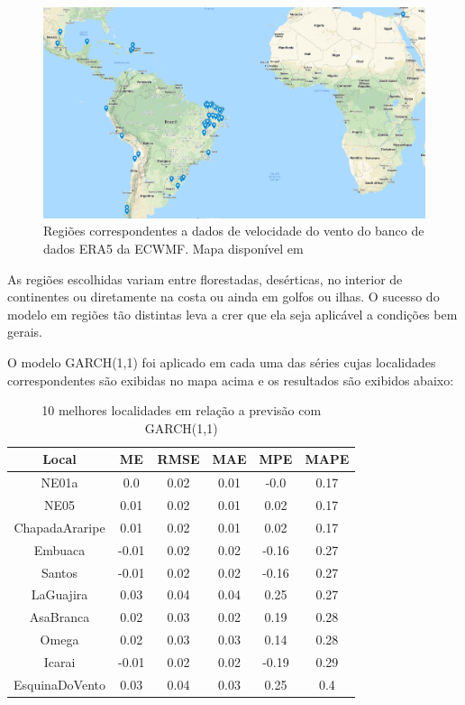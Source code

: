 \documentclass[
	12pt,				%
	openright,			%
	oneside,			%
	a4paper,			%
	english,			%
	french,				%
	spanish,			%
	brazil				%
	]{abntex2}
\begin{document}
\begin{figure}[h]
    \centering
	\includegraphics[width=\textwidth]{latam}
	\caption{Regiões correspondentes a dados de velocidade do vento do banco de dados ERA5 da ECWMF. Mapa disponível em }
\end{figure}
\FloatBarrier

As regiões escolhidas variam entre florestadas, desérticas, no interior de continentes ou diretamente na costa ou ainda em golfos ou ilhas. O sucesso do modelo em regiões tão distintas leva a crer que ela seja aplicável a condições bem gerais.

O modelo GARCH(1,1) foi aplicado em cada uma das séries cujas localidades correspondentes são exibidas no mapa acima e os resultados são exibidos abaixo:

\begin{table}[h]
\centering
\begin{tabular}{ |c|c|c|c|c|c| } 
\hline
\textbf{Local}&\textbf{ME}&\textbf{RMSE}&\textbf{MAE}&\textbf{MPE}&\textbf{MAPE}\\
\hline
NE01a&0.0&0.02&0.01&-0.0&0.17\\
\hline
NE05&0.01&0.02&0.01&0.02&0.17\\
\hline
ChapadaAraripe&0.01&0.02&0.01&0.02&0.17\\
\hline
Embuaca&-0.01&0.02&0.02&-0.16&0.27\\
\hline
Santos&-0.01&0.02&0.02&-0.16&0.27\\
\hline
LaGuajira&0.03&0.04&0.04&0.25&0.27\\
\hline
AsaBranca&0.02&0.03&0.02&0.19&0.28\\
\hline
Omega&0.02&0.03&0.03&0.14&0.28\\
\hline
Icarai&-0.01&0.02&0.02&-0.19&0.29\\
\hline
EsquinaDoVento&0.03&0.04&0.03&0.25&0.4\\
\hline
\end{tabular}
\caption{10 melhores localidades em relação a previsão com GARCH(1,1)}
\end{table}
\end{document}
